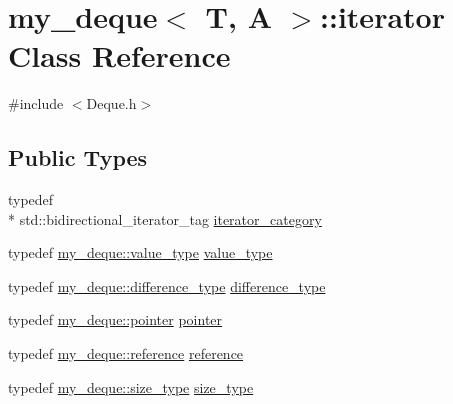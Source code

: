 \hypertarget{classmy__deque_1_1iterator}{\section{my\-\_\-deque$<$ T, A $>$\-:\-:iterator Class Reference}
\label{classmy__deque_1_1iterator}
}


{\ttfamily \#include $<$Deque.\-h$>$}

\subsection*{Public Types}
\begin{DoxyCompactItemize}
\item 
typedef \\*
std\-::bidirectional\-\_\-iterator\-\_\-tag \hyperlink{classmy__deque_1_1iterator_a0479a0f5fbb1adddafb03cd2c9aaef53}{iterator\-\_\-category}
\item 
typedef \hyperlink{classmy__deque_ae9c156c405acc57623a4601ce755596f}{my\-\_\-deque\-::value\-\_\-type} \hyperlink{classmy__deque_1_1iterator_ac6392e82698893d1802ef0407bd36794}{value\-\_\-type}
\item 
typedef \hyperlink{classmy__deque_ac85676cb2492fbc9bbc6f1a30e9d3c73}{my\-\_\-deque\-::difference\-\_\-type} \hyperlink{classmy__deque_1_1iterator_ac5f62e8566ad92478931c2abd9ac6596}{difference\-\_\-type}
\item 
typedef \hyperlink{classmy__deque_a58e82fc365a3b086367479515e1515be}{my\-\_\-deque\-::pointer} \hyperlink{classmy__deque_1_1iterator_add0e1ed49072422b5aa0ef52303fb86e}{pointer}
\item 
typedef \hyperlink{classmy__deque_a4c34c14f397b7676445b37c87003116b}{my\-\_\-deque\-::reference} \hyperlink{classmy__deque_1_1iterator_ae165ee997a9e18330c593789e9899e57}{reference}
\item 
typedef \hyperlink{classmy__deque_a61e5e5317fe72a381ce4d45f09544b02}{my\-\_\-deque\-::size\-\_\-type} \hyperlink{classmy__deque_1_1iterator_a23ff400617b1c6b42ff3f67fb318d19d}{size\-\_\-type}
\end{DoxyCompactItemize}

